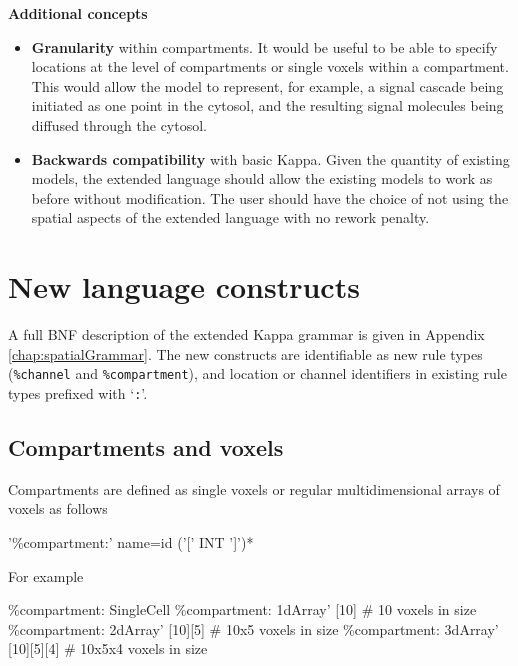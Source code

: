 \textbf{Additional concepts}

\begin{itemize}
 \item \textbf{Granularity} within compartments. It would be useful to be able to specify locations at the level of compartments or single voxels within a compartment. This would allow the model to represent, for example, a signal cascade being initiated as one point in the cytosol, and the resulting signal molecules being diffused through the cytosol. 

 \item \textbf{Backwards compatibility} with basic Kappa. Given the quantity of existing models, the extended language should allow the existing models to work as before without modification. The user should have the choice of not using the spatial aspects of the extended language with no rework penalty.

\end{itemize}


\section{New language constructs}

A full BNF description of the extended Kappa grammar is given in Appendix \ref{chap:spatialGrammar}. The new constructs are identifiable as new rule types (\verb|%channel| and \verb|%compartment|), and location or channel identifiers in existing rule types prefixed with `\verb|:|'.

\subsection{Compartments and voxels}

Compartments are defined as single voxels or regular multidimensional arrays of voxels as follows
\begin{bnfsource}
'\%compartment:' name=id ('[' INT ']')*
\end{bnfsource}
For example
\begin{kappasource}
\%compartment: SingleCell 
\%compartment: 1dArray' [10]       # 10 voxels in size 
\%compartment: 2dArray' [10][5]    # 10x5 voxels in size 
\%compartment: 3dArray' [10][5][4] # 10x5x4 voxels in size 
\end{kappasource}

